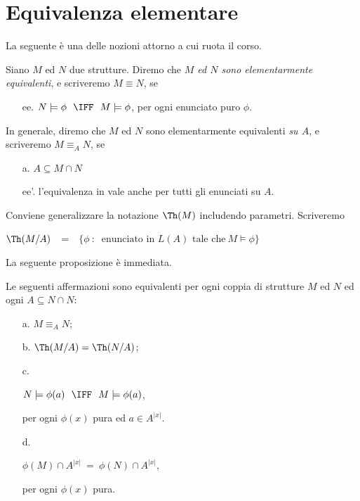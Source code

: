 \section{Equivalenza elementare}\label{eqel}
La seguente \`e una delle nozioni attorno a cui ruota il corso.

\begin{definition}
Siano $M$ ed $N$ due strutture. Diremo che \emph{$M$ ed $N$ sono elementarmente equivalenti}, e scriveremo \emph{$M\equiv N$}, se
\begin{itemize}
\item[ee.] $N\models\phi\ \ \IFF\ \ M\models \phi$,\hspace{4ex} per ogni enunciato puro $\phi$.
\end{itemize}
In generale, diremo che $M$ ed $N$ sono elementarmente equivalenti \emph{su $A$}, e scriveremo \emph{$M\equiv_A N$}, se 
\begin{itemize}
\item[a.] $A\subseteq M\cap N$
\item[ee'.] l'equivalenza in  vale anche per tutti gli enunciati su $A$.\QED
\end{itemize} 
\end{definition}

Conviene generalizzare la notazione $\Th(M)$ includendo parametri. Scriveremo 

\hfil \emph{$\Th(M/A)$}\ \ =\ \ $\Big\{\phi\ :\ \textrm{ enunciato in }L(A)\textrm{ tale che}\  M\models\phi\Big\}$

La seguente proposizione \`e immediata.

\begin{proposition}\label{equivalentielementareequivaleza}
Le seguenti affermazioni sono equivalenti per ogni coppia di strutture $M$ ed $N$ ed ogni $A\subseteq N\cap N$:
\begin{itemize}
\item[a.] $M\equiv_A N$;
\item[b.] $\Th(M/A)=\Th(N/A)$;
\item[c.] \parbox{25ex}{$N\models\phi(a)\ \ \IFF\ \ M\models \phi(a)$,}  per ogni $\phi(x)$ pura ed $a\in A^{|x|}$.
\item[d.]  \parbox{25ex}{$\phi(M) \cap A^{|x|}\ =\ \phi(N) \cap A^{|x|}$,} per ogni $\phi(x)$ pura.\QED
\end{itemize}
\end{proposition}

